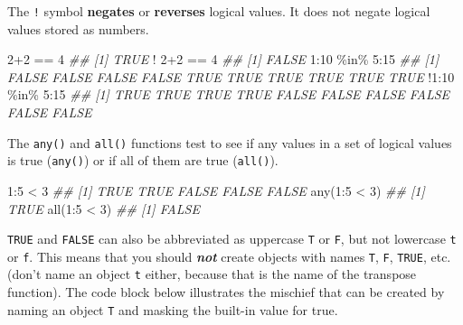 \documentclass[
  13,
  letterpaper,
]{report}
\newenvironment{Shaded}{\begin{snugshade}}{\end{snugshade}}
\newcommand{\DecValTok}[1]{\textcolor[rgb]{0.68,0.00,0.00}{#1}}
\newcommand{\DocumentationTok}[1]{\textcolor[rgb]{0.37,0.37,0.37}{\textit{#1}}}
\newcommand{\FunctionTok}[1]{\textcolor[rgb]{0.28,0.35,0.67}{#1}}
\newcommand{\NormalTok}[1]{\textcolor[rgb]{0.00,0.23,0.31}{#1}}
\newcommand{\SpecialCharTok}[1]{\textcolor[rgb]{0.37,0.37,0.37}{#1}}
\begin{document}
The \texttt{!} symbol \textbf{negates} or \textbf{reverses} logical
values. It does not negate logical values stored as numbers.

\begin{Shaded}
\begin{Highlighting}[]
\DecValTok{2}\SpecialCharTok{+}\DecValTok{2} \SpecialCharTok{==} \DecValTok{4}
\DocumentationTok{\#\# [1] TRUE}
\SpecialCharTok{!} \DecValTok{2}\SpecialCharTok{+}\DecValTok{2} \SpecialCharTok{==} \DecValTok{4}
\DocumentationTok{\#\# [1] FALSE}
\DecValTok{1}\SpecialCharTok{:}\DecValTok{10} \SpecialCharTok{\%in\%} \DecValTok{5}\SpecialCharTok{:}\DecValTok{15}
\DocumentationTok{\#\#  [1] FALSE FALSE FALSE FALSE  TRUE  TRUE  TRUE  TRUE  TRUE  TRUE}
\SpecialCharTok{!}\DecValTok{1}\SpecialCharTok{:}\DecValTok{10} \SpecialCharTok{\%in\%} \DecValTok{5}\SpecialCharTok{:}\DecValTok{15}
\DocumentationTok{\#\#  [1]  TRUE  TRUE  TRUE  TRUE FALSE FALSE FALSE FALSE FALSE FALSE}
\end{Highlighting}
\end{Shaded}

The \texttt{any()} and \texttt{all()} functions test to see if any
values in a set of logical values is true (\texttt{any()}) or if all of
them are true (\texttt{all()}).

\begin{Shaded}
\begin{Highlighting}[]
\DecValTok{1}\SpecialCharTok{:}\DecValTok{5} \SpecialCharTok{\textless{}} \DecValTok{3}
\DocumentationTok{\#\# [1]  TRUE  TRUE FALSE FALSE FALSE}
\FunctionTok{any}\NormalTok{(}\DecValTok{1}\SpecialCharTok{:}\DecValTok{5} \SpecialCharTok{\textless{}} \DecValTok{3}\NormalTok{)}
\DocumentationTok{\#\# [1] TRUE}
\FunctionTok{all}\NormalTok{(}\DecValTok{1}\SpecialCharTok{:}\DecValTok{5} \SpecialCharTok{\textless{}} \DecValTok{3}\NormalTok{)}
\DocumentationTok{\#\# [1] FALSE}
\end{Highlighting}
\end{Shaded}

\texttt{TRUE} and \texttt{FALSE} can also be abbreviated as uppercase
\texttt{T} or \texttt{F}, but not lowercase \texttt{t} or \texttt{f}.
This means that you should \textbf{\emph{not}} create objects with names
\texttt{T}, \texttt{F}, \texttt{TRUE}, etc. (don't name an object
\texttt{t} either, because that is the name of the transpose function).
The code block below illustrates the mischief that can be created by
naming an object \texttt{T} and masking the built-in value for true.
\end{document}
